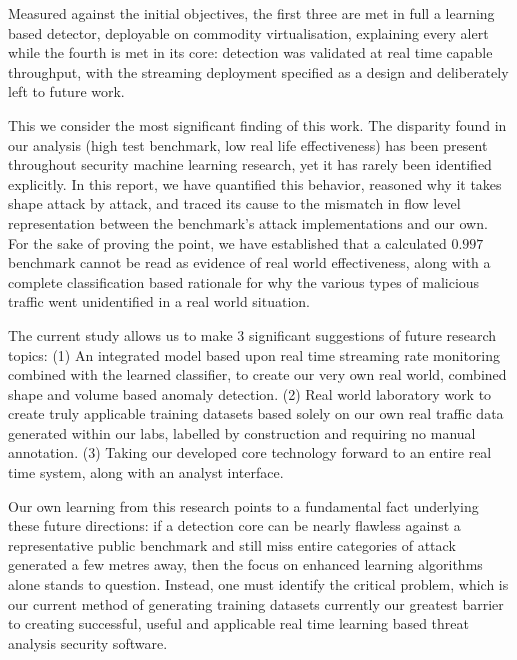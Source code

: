 Measured against the initial objectives, the first three are met in full  a learning based detector, deployable on commodity virtualisation, explaining every alert    while the fourth is met in its core: detection was validated at real time capable throughput, with the streaming deployment specified as a design and deliberately left to future work.

This we consider the most significant finding of this work. The disparity found in our analysis (high test benchmark, low real life effectiveness) has been present throughout security machine learning research, yet it has rarely been identified explicitly. In this report, we have quantified this behavior, reasoned why it takes shape attack by attack, and traced its cause to the mismatch in flow level representation between the benchmark's attack implementations and our own. For the sake of proving the point, we have established that a calculated $0.997$ benchmark cannot be read as evidence of real world effectiveness, along with a complete classification based rationale for why the various types of malicious traffic went unidentified in a real world situation.

The current study allows us to make 3 significant suggestions of future research topics: (1) An integrated model based upon real time streaming rate monitoring combined with the learned classifier, to create our very own real world, combined shape and volume based anomaly detection. (2) Real world laboratory work to create truly applicable training datasets based solely on our own real traffic data generated within our labs, labelled by construction and requiring no manual annotation. (3) Taking our developed core technology forward to an entire real time system, along with an analyst interface.

Our own learning from this research points to a fundamental fact underlying these future directions: if a detection core can be nearly flawless against a representative public benchmark and still miss entire categories of attack generated a few metres away, then the focus on enhanced learning algorithms alone stands to question. Instead, one must identify the critical problem, which is our current method of generating training datasets    currently our greatest barrier to creating successful, useful and applicable real time learning based threat analysis security software.
